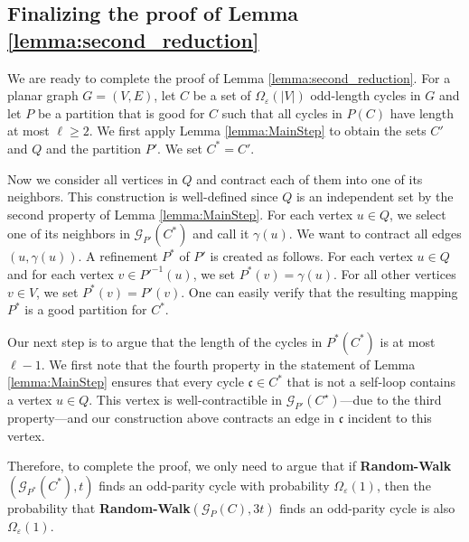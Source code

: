 \documentclass[11pt]{article}
\newcommand{\eps}{\ensuremath{\epsilon}}
\def\epsilon{\ensuremath{\varepsilon}}
\newcommand{\RW}{{\bf Random-Walk}}
\begin{document}
\subsection{Finalizing the proof of Lemma \ref{lemma:second_reduction}}

We are ready to complete the proof of Lemma \ref{lemma:second_reduction}.
For a planar graph $G = (V,E)$, let $C$ be a set of $\Omega_{\eps}(|V|)$ odd-length cycles in $G$ and let $P$ be a partition that is good for $C$ such that all cycles in $P(C)$ have length at most $\ell\ge 2$. We first apply Lemma \ref{lemma:MainStep} to obtain the sets $C'$ and $Q$ and the partition $P'$. We set $C^* = C'$.

Now we consider all vertices in $Q$ and contract each of them into one of its neighbors. This construction is well-defined since $Q$ is an independent set by the second property of Lemma \ref{lemma:MainStep}. For each vertex $u \in Q$, we select one of its neighbors in $\mathcal{G}_{P'}(C^*)$ and call it $\gamma(u)$. We want to contract all edges $(u,\gamma(u))$. A refinement $P^*$ of $P'$ is created as follows. For each vertex $u \in Q$ and for each vertex $v \in P'^{-1}(u)$, we set $P^*(v) = \gamma(u)$. For all other vertices $v \in V$, we set $P^*(v) = P'(v)$. One can easily verify that the resulting mapping $P^*$ is a good partition for $C^*$.

Our next step is to argue that the length of the cycles in $P^*(C^*)$ is at most $\ell-1$. We first note that the fourth property in the statement of Lemma \ref{lemma:MainStep} ensures that every cycle $\mathfrak{c} \in C^*$ that is not a self-loop contains a vertex $u \in Q$. This vertex is well-contractible in $\mathcal G_{P'}(C^\star)$---due to the third property---and our construction above contracts an edge in $\mathfrak{c}$ incident to this vertex.

Therefore, to complete the proof, we only need to argue that if \RW$(\mathcal{G}_{P^*}(C^*),t)$ finds an odd-parity cycle with probability $\Omega_{\eps}(1)$, then the probability that \RW$(\mathcal{G}_{P}(C),3t)$ finds an odd-parity cycle is also $\Omega_{\eps}(1)$.
\end{document}
